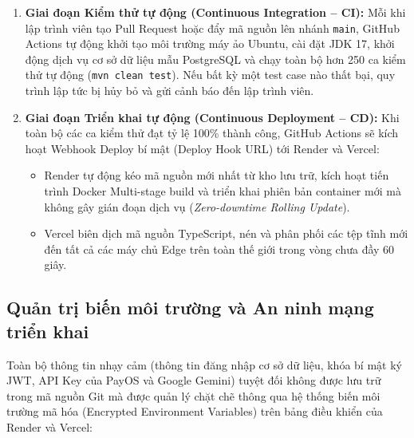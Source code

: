 \begin{enumerate}
    \item \textbf{Giai đoạn Kiểm thử tự động (Continuous Integration -- CI):} Mỗi khi lập trình viên tạo Pull Request hoặc đẩy mã nguồn lên nhánh \texttt{main}, GitHub Actions tự động khởi tạo môi trường máy ảo Ubuntu, cài đặt JDK 17, khởi động dịch vụ cơ sở dữ liệu mẫu PostgreSQL và chạy toàn bộ hơn 250 ca kiểm thử tự động (\texttt{mvn clean test}). Nếu bất kỳ một test case nào thất bại, quy trình lập tức bị hủy bỏ và gửi cảnh báo đến lập trình viên.
    \item \textbf{Giai đoạn Triển khai tự động (Continuous Deployment -- CD):} Khi toàn bộ các ca kiểm thử đạt tỷ lệ 100\% thành công, GitHub Actions sẽ kích hoạt Webhook Deploy bí mật (Deploy Hook URL) tới Render và Vercel:
    \begin{itemize}
        \item Render tự động kéo mã nguồn mới nhất từ kho lưu trữ, kích hoạt tiến trình Docker Multi-stage build và triển khai phiên bản container mới mà không gây gián đoạn dịch vụ (\textit{Zero-downtime Rolling Update}).
        \item Vercel biên dịch mã nguồn TypeScript, nén và phân phối các tệp tĩnh mới đến tất cả các máy chủ Edge trên toàn thế giới trong vòng chưa đầy 60 giây.
    \end{itemize}
\end{enumerate}

\subsection{Quản trị biến môi trường và An ninh mạng triển khai}

Toàn bộ thông tin nhạy cảm (thông tin đăng nhập cơ sở dữ liệu, khóa bí mật ký JWT, API Key của PayOS và Google Gemini) tuyệt đối không được lưu trữ trong mã nguồn Git mà được quản lý chặt chẽ thông qua hệ thống biến môi trường mã hóa (Encrypted Environment Variables) trên bảng điều khiển của Render và Vercel:

